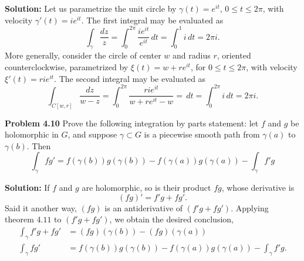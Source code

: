 \documentclass[12pt,oneside]{exam}
\newenvironment{exercise}[1]{\vspace{.1in}\noindent\textbf{Problem #1 \hspace{.05em}}}{}
\begin{document}
\vspace{0.5cm}

\noindent \textbf{Solution:} 
Let us parametrize the unit circle by $\gamma(t) = e^{it}$, $0 \leq t \leq 2\pi$, with velocity $\gamma'(t) = ie^{it}$. The first integral may be evaluated as 
\begin{equation*}
\int_{\gamma} \frac{dz}{z} = \int_{0}^{2\pi} \frac{ie^{it}}{e^{it}}  \, dt = \int_{0}^{1} i \, dt = 2\pi i.
\end{equation*}
More generally, consider the circle of center $w$ and radius $r$, oriented counterclockwise, parametrized by $\xi(t) = w + re^{it}$, for $0 \leq t \leq 2\pi$, with velocity $\xi'(t) = rie^{it}$. The second integral may be evaluated as
\begin{equation*}
\int_{C[w,r]} \frac{dz}{w-z} = \int_{0}^{2\pi} \frac{rie^{it}}{w+re^{it}-w}= \, dt = \int_{0}^{2\pi} i \, dt = 2\pi i.
\end{equation*}

\vspace{1cm}

\begin{exercise}{4.10}
Prove the following integration by parts statement: let $f$ and $g$ be holomorphic in $G$, and suppose $\gamma \subset G$ is a piecewise smooth path from $\gamma(a)$ to $\gamma(b)$. Then 
\begin{equation*}
\int_{\gamma} fg' = f(\gamma(b))g(\gamma(b))-f(\gamma(a))g(\gamma(a)) - \int_{\gamma}f'g 
\end{equation*}
\end{exercise}

\vspace{0.5cm}

\noindent \textbf{Solution:} If $f$ and $g$ are holomorphic, so is their product $fg$, whose derivative is 
\begin{equation*}
(fg)'=f'g+fg'.
\end{equation*}
Said it another way, $(fg)$ is an antiderivative of $(f'g+fg')$. Applying theorem $4.11$ to $(f'g+fg')$, we obtain the desired conclusion,
\begin{align*}
\int_{\gamma} f'g+fg' & = (fg)(\gamma(b))-(fg)(\gamma(a)) \\
\int_{\gamma} fg' & = f(\gamma(b))g(\gamma(b))-f(\gamma(a))g(\gamma(a))-\int_{\gamma} f'g.
\end{align*}
\end{document}
